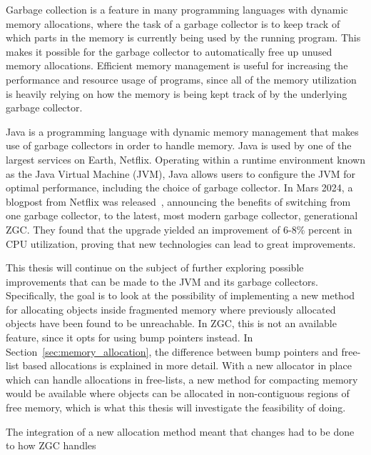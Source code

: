 
Garbage collection is a feature in many programming languages with dynamic memory allocations, where the task of a garbage collector is to keep track of which parts in the memory is currently being used by the running program. This makes it possible for the garbage collector to automatically free up unused memory allocations. Efficient memory management is useful for increasing the performance and resource usage of programs, since all of the memory utilization is heavily relying on how the memory is being kept track of by the underlying garbage collector.

Java is a programming language with dynamic memory management that makes use of garbage collectors in order to handle memory. Java is used by one of the largest services on Earth, Netflix. Operating within a runtime environment known as the Java Virtual Machine (JVM), Java allows users to configure the JVM for optimal performance, including the choice of garbage collector. In Mars 2024, a blogpost from Netflix was released~\cite{netflix:zgc}, announcing the benefits of switching from one garbage collector, to the latest, most modern garbage collector, generational ZGC. They found that the upgrade yielded an improvement of 6-8\% percent in CPU utilization, proving that new technologies can lead to great improvements.

This thesis will continue on the subject of further exploring possible improvements that can be made to the JVM and its garbage collectors. Specifically, the goal is to look at the possibility of implementing a new method for allocating objects inside fragmented memory where previously allocated objects have been found to be unreachable. In ZGC, this is not an available feature, since it opts for using bump pointers instead. In Section~\ref{sec:memory_allocation}, the difference between bump pointers and free-list based allocations is explained in more detail. With a new allocator in place which can handle allocations in free-lists, a new method for compacting memory would be available where objects can be allocated in non-contiguous regions of free memory, which is what this thesis will investigate the feasibility of doing.

The integration of a new allocation method meant that changes had to be done to how ZGC handles 